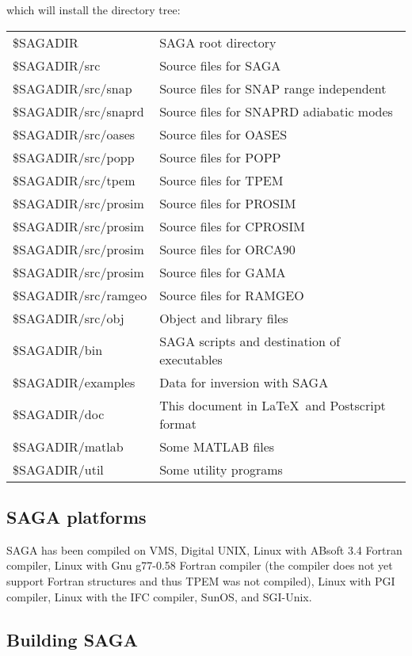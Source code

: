 \documentclass{saclantc}
\begin{document}
\noindent which will install the directory tree:

\begin{tabular}{ll}
\$SAGADIR &  {\sf SAGA} root directory \\
\$SAGADIR/src & Source files for {\sf SAGA} \\
\$SAGADIR/src/snap & Source files for {\sf SNAP} range independent  \\
\$SAGADIR/src/snaprd & Source files for {{\sf SNAPRD}} adiabatic modes  \\
\$SAGADIR/src/oases & Source files for {{\sf OASES}} \\
\$SAGADIR/src/popp & Source files for {{\sf POPP}} \\
\$SAGADIR/src/tpem & Source files for {{\sf TPEM}} \\
\$SAGADIR/src/prosim & Source files for {{\sf PROSIM}} \\
\$SAGADIR/src/prosim & Source files for {{\sf CPROSIM}} \\
\$SAGADIR/src/prosim & Source files for {{\sf ORCA90}} \\
\$SAGADIR/src/prosim & Source files for {{\sf GAMA}} \\
\$SAGADIR/src/ramgeo & Source files for {{\sf RAMGEO}} \\
\$SAGADIR/src/obj & Object and library files \\
\$SAGADIR/bin  &  {\sf SAGA} scripts and destination of executables \\
\$SAGADIR/examples & Data for inversion with {\sf SAGA }\\
\$SAGADIR/doc & This document in \LaTeX\, and Postscript format \\
\$SAGADIR/matlab  & Some MATLAB files\\
\$SAGADIR/util  & Some utility programs
\end{tabular}

\subsection{SAGA platforms}
{\sf SAGA} has been compiled on VMS, Digital UNIX, Linux with ABsoft
3.4 Fortran compiler, Linux with Gnu g77-0.58 Fortran compiler (the
compiler does not yet support Fortran structures and thus {\sf TPEM}
was not compiled), Linux with PGI compiler, Linux with the IFC
compiler, SunOS, and SGI-Unix.

\subsection{Building  SAGA}
\end{document}
